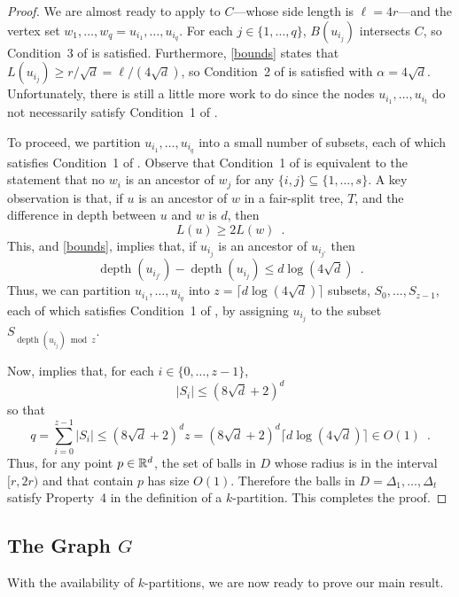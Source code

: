 \documentclass{patmorin}
\DeclareMathOperator{\depth}{depth}
\begin{document}
\begin{proof}
  We are almost ready to apply  to
  $C$---whose side length is $\ell = 4r$---and the vertex set
  $w_1,\ldots,w_q=u_{i_1},\ldots,u_{i_q}$. For each $j\in\{1,\ldots,q\}$,
  $B(u_{i_j})$ intersects $C$, so Condition~3 of 
  is satisfied.  Furthermore, \eqref{bounds} states that $L(u_{i_j})\ge
  r/\sqrt{d} = \ell/(4\sqrt{d})$, so Condition~2 of 
  is satisfied with $\alpha=4\sqrt{d}$.  Unfortunately, there is still
  a little more work to do since the nodes $u_{i_1},\ldots,u_{i_t}$
  do not necessarily satisfy Condition~1 of .

  To proceed, we partition $u_{i_1},\ldots,u_{i_q}$ into a small number of
  subsets, each of which satisfies Condition~1 of .
  Observe that Condition~1 of  is equivalent
  to the statement that no $w_i$ is an ancestor of $w_j$ for any
  $\{i,j\}\subseteq\{1,\ldots,s\}$.  A key observation is that, if $u$
  is an ancestor of $w$ in a fair-split tree, $T$, and the difference
  in depth between $u$ and $w$ is $d$, then
  \[
      L(u) \ge 2L(w) \enspace .
  \]
  This, and \eqref{bounds}, implies that, if $u_{i_j}$ is an ancestor
  of $u_{i_{j'}}$ then
  \[
     \depth(u_{i_{j'}})-\depth(u_{i_{j}}) \le d\log(4\sqrt{d}) \enspace .
  \]
  Thus, we can partition $u_{i_1},\ldots,u_{i_q}$ into $z=\lceil
  d\log(4\sqrt{d})\rceil$ subsets, $S_0,\ldots,S_{z-1}$, each of which
  satisfies Condition~1 of , by assigning $u_{i_j}$
  to the subset $S_{\depth(u_{i_j})\bmod z}$.  

  Now,  implies that, for each $i\in\{0,\ldots,z-1\}$, 
  \[
     |S_i|\le (8\sqrt{d}+2)^d
  \]
  so that
  \[
     q = \sum_{i=0}^{z-1}|S_i|\le (8\sqrt{d}+2)^dz = (8\sqrt{d}+2)^d\lceil d\log(4\sqrt{d})\rceil  \in O(1) \enspace .
  \]
  Thus, for any point $p\in\mathbb{R}^d$, the set of balls in $D$ whose radius
  is in the interval $[r,2r)$ and that contain $p$ has size $O(1)$.
  Therefore the balls in $D=\Delta_1,\ldots,\Delta_t$ satisfy Property~4
  in the definition of a $k$-partition.  This completes the proof.
\end{proof}

\subsection{The Graph $G$}

With the availability of $k$-partitions, we are now ready to prove our
main result.
\end{document}
